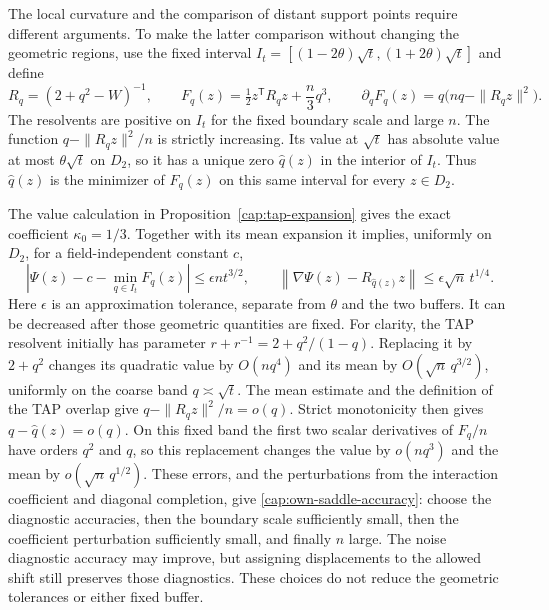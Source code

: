 The local curvature and the comparison of distant support points require
different arguments. To make the latter comparison without changing the
geometric regions, use the fixed interval
$I_t=[(1-2\theta)\sqrt t,(1+2\theta)\sqrt t]$ and define
\begin{equation}\label{cap:own-saddle-potential}
 R_q=(2+q^2-W)^{-1},\qquad
 F_q(z)=\tfrac12 z^{\mathsf T}R_qz+\frac n3q^3,
 \qquad
 \partial_qF_q(z)=q\bigl(nq-\|R_qz\|^2\bigr).
\end{equation}
The resolvents are positive on $I_t$ for the fixed boundary scale and large
$n$. The function $q-\|R_qz\|^2/n$ is strictly increasing. Its value at
$\sqrt t$ has absolute value at most $\theta\sqrt t$ on $D_2$, so it has a
unique zero $\widehat q(z)$ in the interior of $I_t$. Thus $\widehat q(z)$ is
the minimizer of $F_q(z)$ on this same interval for every $z\in D_2$.

The value calculation in Proposition~\ref{cap:tap-expansion} gives the exact
coefficient $\kappa_0=1/3$. Together with its mean expansion it implies,
uniformly on $D_2$, for a field-independent constant $c$,
\begin{equation}\label{cap:own-saddle-accuracy}
 \left|\Psi(z)-c-\min_{q\in I_t}F_q(z)\right|
       \le\epsilon nt^{3/2},\qquad
 \left\|\nabla\Psi(z)-R_{\widehat q(z)}z\right\|
       \le\epsilon\sqrt n\,t^{1/4}.
\end{equation}
Here $\epsilon$ is an approximation tolerance, separate from $\theta$ and
the two buffers. It can be decreased after those geometric quantities are
fixed. For clarity, the TAP resolvent initially has parameter
$r+r^{-1}=2+q^2/(1-q)$. Replacing it by $2+q^2$ changes its quadratic value
by $O(nq^4)$ and its mean by $O(\sqrt n\,q^{3/2})$, uniformly on the
coarse band $q\asymp\sqrt t$. The mean estimate and the definition of the
TAP overlap give $q-\|R_qz\|^2/n=o(q)$. Strict monotonicity then gives
$q-\widehat q(z)=o(q)$. On this fixed band the first two scalar derivatives
of $F_q/n$ have orders $q^2$ and $q$, so this replacement changes the value
by $o(nq^3)$ and the mean by $o(\sqrt n\,q^{1/2})$. These errors, and the
perturbations from the interaction coefficient and diagonal completion, give
\eqref{cap:own-saddle-accuracy}: choose the diagnostic accuracies, then the
boundary scale sufficiently small, then the coefficient perturbation
sufficiently small, and finally $n$ large. The noise diagnostic accuracy may improve, but assigning displacements to
the allowed shift still preserves those diagnostics. These choices do not
reduce the geometric tolerances or either fixed buffer.

